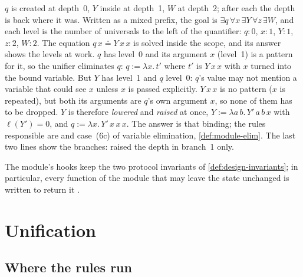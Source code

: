 \begin{tutorial}
$q$ is created at depth~0, $Y$ inside  at depth~1, $W$ at depth~2; after each  the depth
is back where it was. Written as a mixed prefix, the goal is $\exists q\,\forall x\,\exists Y\,\forall z\,\exists W$,
and each level is the number of universals to the left of the quantifier: $q{:}0$, $x{:}1$, $Y{:}1$, $z{:}2$,
$W{:}2$. The equation $q\,x \doteq Y\,x\,x$ is solved inside the scope, and its answer shows the
levels at work. $q$ has level~0 and its argument $x$ (level~1) is a pattern for it, so the unifier eliminates
$q$: $q := \lambda x.\,t'$ where $t'$ is $Y\,x\,x$ with $x$ turned into the bound variable. But $Y$ has
level~1 and $q$ level~0: $q$'s value may not mention a variable that could see $x$ unless $x$ is passed
explicitly. $Y\,x\,x$ is no pattern ($x$ is repeated), but both its arguments are $q$'s own argument $x$,
so none of them has to be dropped. $Y$ is therefore \emph{lowered} and \emph{raised} at once, $Y := \lambda a\,b.\,Y'\,a\,b\,x$ with
$\ell(Y')=0$, and $q := \lambda x.\,Y'\,x\,x\,x$. The answer  is that binding; the
rules responsible are  and case~(6c) of variable elimination, \cref{def:module-elim}. The last
two lines show the branches:  raised the depth in branch~1 only.
\end{tutorial}

The module's hooks keep the two protocol invariants of \cref{def:design-invariants}; in particular, every
function of the module that may leave the state unchanged is written to return it .

\section{Unification}\label{sec:module-unif}

\subsection{Where the rules run}

